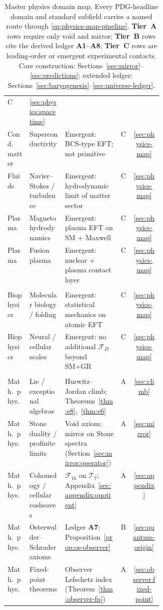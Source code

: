 \begin{table}[p]
\begin{tabular}{@{}llp{0.36\linewidth}cc@{}}
  C & \ref{sec:physics:spacetime} \\
Cond.\ matter &
  Superconductivity &
  Emergent: BCS-type EFT; not primitive &
  C & \ref{sec:physics-map} \\
Fluids &
  Navier--Stokes / turbulence &
  Emergent: hydrodynamic limit of matter sector &
  C & \ref{sec:physics-map} \\
Plasma &
  Magnetohydrodynamics &
  Emergent: plasma EFT on SM + Maxwell &
  C & \ref{sec:physics-map} \\
Plasma &
  Fusion plasma &
  Emergent: nuclear + plasma contact layer &
  C & \ref{sec:physics-map} \\
\addlinespace
\multicolumn{5}{@{}l}{\textit{Biophysics (emergent)}} \\
\midrule
Biophysics &
  Molecular biology / folding &
  Emergent: statistical mechanics on atomic EFT &
  C & \ref{sec:physics-map} \\
Biophysics &
  Neural / cellular scales &
  Emergent: no additional $\mathcal{F}_D$ beyond SM+GR &
  C & \ref{sec:physics-map} \\
\addlinespace
\multicolumn{5}{@{}l}{\textit{Mathematical physics imports (explicit)}} \\
\midrule
Math.\ phys. &
  Lie / exceptional algebras &
  Hurwitz--Jordan climb; Theorems~\ref{thm:e8},~\ref{thm:e6} &
  A & \ref{sec:climb} \\
Math.\ phys. &
  Stone duality / profinite limits &
  Void axiom; mirror on Stone spectra (Section~\ref{sec:mirror:operator}) &
  A & \ref{sec:mirror} \\
Math.\ phys. &
  Cohomology / cellular cosheaves &
  $\mathcal{F}_{16}$ on $\mathcal{T}_7$;
  Appendix~\ref{sec:appendix:quotient} &
  A & \ref{sec:appendix} \\
Math.\ phys. &
  Osterwalder--Schrader axioms &
  Ledger \textbf{A7}; Proposition~\ref{prop:os-observer} &
  B & \ref{sec:quantum-origin} \\
Math.\ phys. &
  Fixed-point theorems &
  Observer Lefschetz index (Theorem~\ref{thm:observer-fp}) &
  A & \ref{sec:observer:fixed-point} \\
\bottomrule
\end{tabular}
\caption{Master physics domain map. Every PDG-headline domain and standard
subfield carries a named route through \eqref{eq:physics-map-pipeline}.
\textbf{Tier~A} rows require only void and mirror; \textbf{Tier~B} rows cite
the derived ledger \textbf{A1--A8}; \textbf{Tier~C} rows are leading-order or
emergent experimental contacts. Core construction:
Sections~\ref{sec:mirror}--\ref{sec:predictions}; extended ledger:
Sections~\ref{sec:baryogenesis}--\ref{sec:universe-ledger}.}
\label{tab:physics-map-complete}
\end{table}

